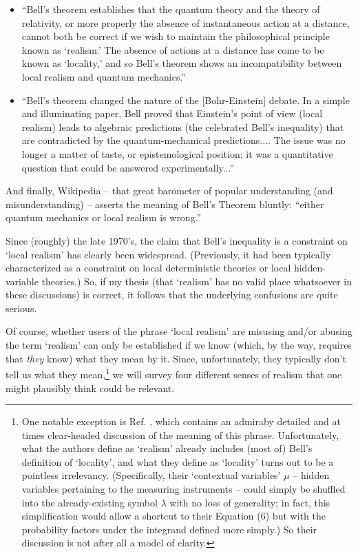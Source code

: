 \documentclass[12pt]{article}
\begin{document}
\begin{itemize}
\item ``Bell's
  theorem establishes that the quantum theory and the theory of
  relativity, or more properly the absence of instantaneous action at
  a distance, cannot both be correct if we wish to maintain the
  philosophical principle known as `realism.'  The absence of actions
  at a distance has come to be known as `locality,' and so Bell's
  theorem shows an incompatibility between local realism and quantum
  mechanics.'' \cite{ferrero}

\item ``Bell's theorem changed the nature of
  the [Bohr-Einstein] debate.  In a simple and illuminating paper,
  Bell proved that Einstein's point of view (local realism) leads to
  algebraic predictions (the celebrated Bell's inequality) that are
  contradicted by the quantum-mechanical predictions.... The issue was
  no longer a matter of taste, or epistemological position: it was a
  quantitative question that could be answered
  experimentally...''\cite{aspect}

\end{itemize}
And finally, Wikipedia -- that great barometer of popular
understanding (and misunderstanding)
 -- asserts the meaning of Bell's Theorem bluntly:
``either quantum mechanics or local realism is wrong.''\cite{wikipedia}

Since (roughly) the late 1970's, the claim that Bell's inequality
is a constraint on `local realism' has clearly been widespread. 
(Previously, it had been typically characterized as a constraint on local
deterministic theories or local hidden-variable theories.)
So, if my thesis (that `realism' has no valid place whatsoever in
these discussions) is correct, it follows that the underlying 
confusions are quite serious.

Of course, whether users of the phrase `local realism' 
are misusing and/or abusing the term `realism' can only be
established if we know (which, by the way, requires that \emph{they}
know) what they mean by it.  Since, unfortunately, they typically
don't tell us what they mean,\footnote{One notable exception 
is Ref. \cite{ferrero},
  which contains an admiraby detailed and at times clear-headed
  discussion of the meaning of this phrase.  Unfortunately, what the authors
  define as `realism' already includes (most of) Bell's definition
  of `locality', and what they define as `locality' turns out to
  be a pointless irrelevancy.  (Specifically, their `contextual
  variables' $\mu$ -- hidden variables pertaining to the measuring
  instruments -- could simply be shuffled into the already-existing
  symbol $\lambda$ with no loss of generality; in fact,
  this simplification would allow a shortcut to their Equation (6)
  but with the probability factors under the integrand defined more
  simply.) So their discussion is not after all a model of clarity.}
we will survey four different senses of realism that one might 
plausibly think could be relevant.
\end{document}
